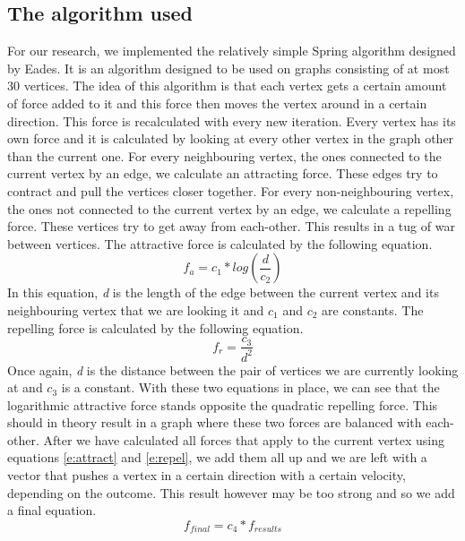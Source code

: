 \documentclass[a4paper,12pt,twoside]{article}
\begin{document}
\subsection{The algorithm used}\label{s:algorithm}
For our research, we implemented the relatively simple Spring algorithm designed by Eades\cite{Eades}. It is an algorithm designed to be used on graphs consisting of at most 30 vertices. The idea of this algorithm is that each vertex gets a certain amount of force added to it and this force then moves the vertex around in a certain direction. This force is recalculated with every new iteration. Every vertex has its own force and it is calculated by looking at every other vertex in the graph other than the current one. For every neighbouring vertex, the ones connected to the current vertex by an edge, we calculate an attracting force. These edges try to contract and pull the vertices closer together. For every non-neighbouring vertex, the ones not connected to the current vertex by an edge, we calculate a repelling force. These vertices try to get away from each-other. This results in a tug of war between vertices. 
\newline
The attractive force is calculated by the following equation.
\begin{equation}\label{e:attract}
f_a = c_1*log(\frac{d}{c_2})
\end{equation}
In this equation, \emph{d} is the length of the edge between the current vertex and its neighbouring vertex that we are looking it and \emph{$c_1$} and \emph{$c_2$} are constants.
\newline
The repelling force is calculated by the following equation.
\begin{equation}\label{e:repel}
f_r = \frac{c_3}{d^2}
\end{equation}
Once again, \emph{d} is the distance between the pair of vertices we are currently looking at and \emph{$c_3$} is a constant. With these two equations in place, we can see that the logarithmic attractive force stands opposite the quadratic repelling force. This should in theory result in a graph where these two forces are balanced with each-other.
\newline
After we have calculated all forces that apply to the current vertex using equations \ref{e:attract} and \ref{e:repel}, we add them all up and we are left with a vector that pushes a vertex in a certain direction with a certain velocity, depending on the outcome. This result however may be too strong and so we add a final equation.
\begin{equation}\label{e:damper}
f_{final} = c_4 * f_{results}
\end{equation}
\end{document}
